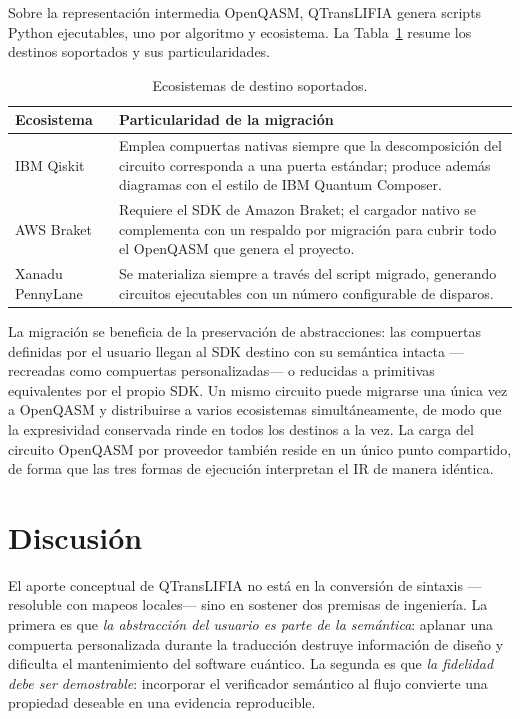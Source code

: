 \documentclass[11pt,a4paper]{article}
\begin{document}
Sobre la representación intermedia OpenQASM, QTransLIFIA genera scripts Python ejecutables,
uno por algoritmo y ecosistema. La Tabla~\ref{tab:proveedores} resume los destinos
soportados y sus particularidades.

\begin{table}[htbp]
\centering
\small
\caption{Ecosistemas de destino soportados.}
\label{tab:proveedores}
\begin{tabular}{@{}p{}p{}@{}}
\toprule
\textbf{Ecosistema} & \textbf{Particularidad de la migración} \\
\midrule
IBM Qiskit & Emplea compuertas nativas siempre que la descomposición del circuito corresponda
a una puerta estándar; produce además diagramas con el estilo de IBM Quantum Composer. \\
AWS Braket & Requiere el SDK de Amazon Braket; el cargador nativo se complementa con un
respaldo por migración para cubrir todo el OpenQASM que genera el proyecto. \\
Xanadu PennyLane & Se materializa siempre a través del script migrado, generando circuitos
ejecutables con un número configurable de disparos. \\
\bottomrule
\end{tabular}
\end{table}

La migración se beneficia de la preservación de abstracciones: las compuertas definidas por
el usuario llegan al SDK destino con su semántica intacta ---recreadas como compuertas
personalizadas--- o reducidas a primitivas equivalentes por el propio SDK. Un mismo circuito
puede migrarse una única vez a OpenQASM y distribuirse a varios ecosistemas
simultáneamente, de modo que la expresividad conservada rinde en todos los destinos a la
vez. La carga del circuito OpenQASM por proveedor también reside en un único punto
compartido, de forma que las tres formas de ejecución interpretan el IR de manera idéntica.

\section{Discusión}
\label{sec:discusion}

El aporte conceptual de QTransLIFIA no está en la conversión de sintaxis ---resoluble con
mapeos locales--- sino en sostener dos premisas de ingeniería. La primera es que
\emph{la abstracción del usuario es parte de la semántica}: aplanar una compuerta
personalizada durante la traducción destruye información de diseño y dificulta el
mantenimiento del software cuántico. La segunda es que \emph{la fidelidad debe ser
demostrable}: incorporar el verificador semántico al flujo convierte una propiedad deseable en
una evidencia reproducible.
\end{document}
